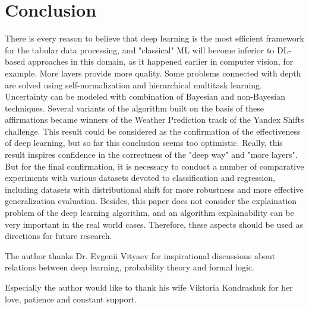 \documentclass{article}
\begin{document}
\section{Conclusion}

There is every reason to believe that deep learning is the most efficient framework for the tabular data processing, and "classical" ML will become inferior to DL-based approaches in this domain, as it happened earlier in computer vision, for example. More layers provide more quality. Some problems connected with depth are solved using self-normalization and hierarchical multitask learning. Uncertainty can be modeled with combination of Bayesian and non-Bayesian techniques. Several variants of the algorithm built on the basis of these affirmations became winners of the Weather Prediction track of the Yandex Shifts challenge. This result could be considered as the confirmation of the effectiveness of deep learning, but so far this conclusion seems too optimistic. Really, this result inspires confidence in the correctness of the "deep way" and "more layers". But for the final confirmation, it is necessary to conduct a number of comparative experiments with various datasets devoted to classification and regression, including datasets with distributional shift for more robustness and more effective generalization evaluation. Besides, this paper does not consider the explaination problem of the deep learning algorithm, and an algorithm explainability can be very important in the real world cases. Therefore, these aspects should be used as directions for future research.

\begin{ack}
The author thanks Dr. Evgenii Vityaev for inspirational discussions about relations between deep learning, probability theory and formal logic.

Especially the author would like to thank his wife Viktoria Kondrashuk for her love, patience and constant support.

\end{ack}



\end{document}
